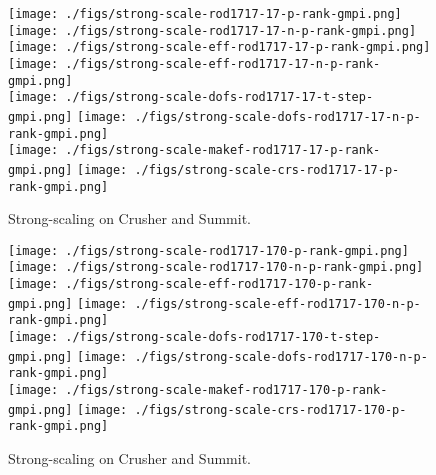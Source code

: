 \begin{figure*}[t]
  \begin{center}
     \texttt{[image: ./figs/strong-scale-rod1717-17-p-rank-gmpi.png]}
     \texttt{[image: ./figs/strong-scale-rod1717-17-n-p-rank-gmpi.png]}
     \\
     \texttt{[image: ./figs/strong-scale-eff-rod1717-17-p-rank-gmpi.png]}
     \texttt{[image: ./figs/strong-scale-eff-rod1717-17-n-p-rank-gmpi.png]}
     \\
     \texttt{[image: ./figs/strong-scale-dofs-rod1717-17-t-step-gmpi.png]}
     \texttt{[image: ./figs/strong-scale-dofs-rod1717-17-n-p-rank-gmpi.png]}
     \\
     \texttt{[image: ./figs/strong-scale-makef-rod1717-17-p-rank-gmpi.png]}
     \texttt{[image: ./figs/strong-scale-crs-rod1717-17-p-rank-gmpi.png]}
   \caption{\label{perf170}Strong-scaling on Crusher and Summit.}
  \end{center}
\end{figure*}




\begin{figure*}[t]
  \begin{center}
     \texttt{[image: ./figs/strong-scale-rod1717-170-p-rank-gmpi.png]}
     \texttt{[image: ./figs/strong-scale-rod1717-170-n-p-rank-gmpi.png]}
     \\
     \texttt{[image: ./figs/strong-scale-eff-rod1717-170-p-rank-gmpi.png]}
     \texttt{[image: ./figs/strong-scale-eff-rod1717-170-n-p-rank-gmpi.png]}
     \\
     \texttt{[image: ./figs/strong-scale-dofs-rod1717-170-t-step-gmpi.png]}
     \texttt{[image: ./figs/strong-scale-dofs-rod1717-170-n-p-rank-gmpi.png]}
     \\
     \texttt{[image: ./figs/strong-scale-makef-rod1717-170-p-rank-gmpi.png]}
     \texttt{[image: ./figs/strong-scale-crs-rod1717-170-p-rank-gmpi.png]}
   \caption{\label{perf170}Strong-scaling on Crusher and Summit.}
  \end{center}
\end{figure*}





